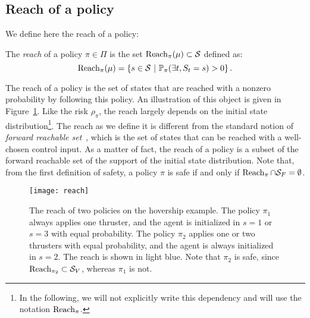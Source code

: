 \subsection{Reach of a policy}
We define here the reach of a policy:
\begin{definition}[Reach]
	The\emph{ reach} of a policy $\pi\in\Pi$ is the set $\operatorname{Reach}_\pi(\mu)\subset\mathcal{S}$ defined as:
	\begin{equation}
		\operatorname{Reach}_\pi(\mu) = \left\{s\in\mathcal{S}~\middle|~\mathbb{P}_\pi(\exists t, S_t = s) > 0\right\}. \label{eq:reach}
	\end{equation}
\end{definition}
The reach of a policy is the set of states that are reached with a nonzero probability by following this policy. An illustration of this object is given in Figure~\ref{fig:reach example}. Like the risk $\rho_\pi$, the reach largely depends on the initial state distribution\footnote{In the following, we will not explicitly write this dependency and will use the notation $\operatorname{Reach}_\pi$.}. The reach as we define it is different from the standard notion of\emph{ forward reachable set}~\cite{bansal2017hamilton}, which is the set of states that can be reached with a well-chosen control input. As a matter of fact, the reach of a policy is a subset of the forward reachable set of the support of the initial state distribution. Note that, from the first definition of safety, a policy $\pi$ is safe if and only if $\operatorname{Reach}_\pi \cap{\ensuremath{\mathcal{S}}_{F}} = \emptyset$.
\begin{figure}
	\centering
	\texttt{[image: reach]}
	\caption[Reach of a policy]{The reach of two policies on the hovership example. The policy $\pi_1$ always applies one thruster, and the agent is initialized in $s=1$ or $s=3$ with equal probability. The policy $\pi_2$ applies one or two thrusters with equal probability, and the agent is always initialized in $s=2$. The reach is shown in light blue. Note that $\pi_2$ is safe, since $\operatorname{Reach}_{\pi_2} \subset{\ensuremath{\mathcal{S}}_{V}}$, whereas $\pi_1$ is not.}
	\label{fig:reach example}
\end{figure}
